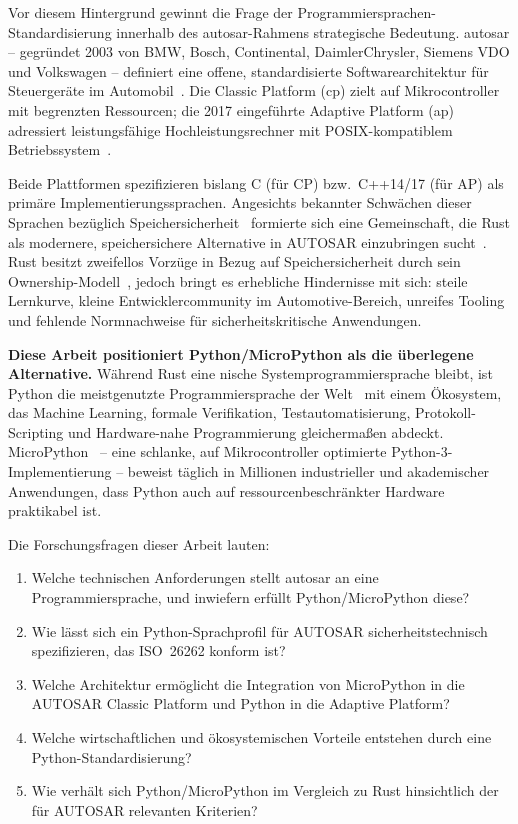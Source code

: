 ﻿\documentclass[12pt,a4paper,twoside]{article}
\begin{document}
Vor diesem Hintergrund gewinnt die Frage der Programmiersprachen-Standardisierung
innerhalb des \gls{autosar}-Rahmens strategische Bedeutung.
\gls{autosar} -- gegründet 2003 von BMW, Bosch, Continental, DaimlerChrysler,
Siemens VDO und Volkswagen -- definiert eine offene, standardisierte
Softwarearchitektur für Steuergeräte im Automobil~\cite{autosar_overview2017}.
Die Classic Platform (\gls{cp}) zielt auf Mikrocontroller mit begrenzten
Ressourcen; die 2017 eingeführte Adaptive Platform (\gls{ap}) adressiert
leistungsfähige Hochleistungsrechner mit POSIX-kompatiblem Betriebssystem~\cite{autosar_ap_explained2019}.

Beide Plattformen spezifizieren bislang C (für CP) bzw.\ C++14/17 (für AP)
als primäre Implementierungssprachen.
Angesichts bekannter Schwächen dieser Sprachen bezüglich
Speichersicherheit~\cite{memory_safety_nsa2022} formierte sich eine Gemeinschaft,
die Rust als modernere, speichersichere Alternative in AUTOSAR einzubringen
sucht~\cite{autosar_rust_wp2023, autosar_wg_rustsafety}.
Rust besitzt zweifellos Vorzüge in Bezug auf Speichersicherheit durch sein
Ownership-Modell~\cite{rust_book2022}, jedoch bringt es erhebliche Hindernisse mit sich:
steile Lernkurve, kleine Entwicklercommunity im Automotive-Bereich,
unreifes Tooling und fehlende Normnachweise für sicherheitskritische Anwendungen.

\textbf{Diese Arbeit positioniert Python/MicroPython als die überlegene Alternative.}
Während Rust eine nische Systemprogrammiersprache bleibt, ist Python die
meistgenutzte Programmiersprache der Welt~\cite{tiobe2025, stackoverflow_survey2024}
mit einem Ökosystem, das Machine Learning, formale Verifikation,
Testautomatisierung, Protokoll-Scripting und Hardware-nahe Programmierung
gleichermaßen abdeckt.
MicroPython~\cite{micropython_main, george2014micropython} -- eine schlanke,
auf Mikrocontroller optimierte Python-3-Implementierung -- beweist täglich
in Millionen industrieller und akademischer Anwendungen, dass Python
auch auf ressourcenbeschränkter Hardware praktikabel ist.

Die Forschungsfragen dieser Arbeit lauten:
\begin{enumerate}
  \item Welche technischen Anforderungen stellt \gls{autosar} an eine Programmiersprache,
        und inwiefern erfüllt Python/MicroPython diese?
  \item Wie lässt sich ein Python-Sprachprofil für AUTOSAR sicherheitstechnisch
        spezifizieren, das ISO~26262 konform ist?
  \item Welche Architektur ermöglicht die Integration von MicroPython in die
        AUTOSAR Classic Platform und Python in die Adaptive Platform?
  \item Welche wirtschaftlichen und ökosystemischen Vorteile entstehen durch
        eine Python-Standardisierung?
  \item Wie verhält sich Python/MicroPython im Vergleich zu Rust hinsichtlich
        der für AUTOSAR relevanten Kriterien?
\end{enumerate}
\end{document}
